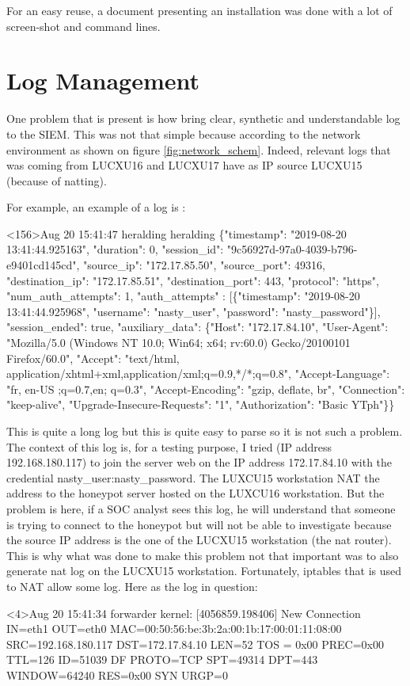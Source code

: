 \documentclass{tnreport}
\begin{document}
For an easy reuse, a document presenting an installation was done with a lot of screen-shot and command lines. 
\section{Log Management}
One problem that is present is how bring clear, synthetic and understandable log to the SIEM. This was not that simple because according to the network environment as shown on figure \ref{fig:network_schem}. Indeed, relevant logs that was coming from LUCXU16 and LUCXU17 have as IP source LUCXU15 (because of natting).

For example, an example of a log is : 

<156>Aug 20 15:41:47 heralding heralding \{"timestamp": "2019-08-20 13:41:44.925163", "duration": 0, "session\_id": "9c56927d-97a0-4039-b796-e9401cd145cd", "source\_ip": "172.17.85.50", "source\_port": 49316, "destination\_ip": "172.17.85.51", "destination\_port": 443, "protocol": "https", "num\_auth\_attempts": 1, "auth\_attempts" : [\{"timestamp": "2019-08-20 13:41:44.925968", "username": "nasty\_user", "password": "nasty\_password"\}], "session\_ended": true, "auxiliary\_data": \{"Host": "172.17.84.10", "User-Agent": "Mozilla/5.0 (Windows NT 10.0; Win64; x64; rv:60.0) Gecko/20100101 Firefox/60.0", "Accept": "text/html, application/xhtml+xml,application/xml;q=0.9,*/*;q=0.8", "Accept-Language": "fr, en-US ;q=0.7,en; q=0.3", "Accept-Encoding": "gzip, deflate, br", "Connection": "keep-alive", "Upgrade-Insecure-Requests": "1", "Authorization": "Basic YTph"\}\}

This is quite a long log but this is quite easy to parse so it is not such a problem. The context of this log is, for a testing purpose, I tried (IP address 192.168.180.117) to  join the server web on the IP address 172.17.84.10 with the credential nasty\_user:nasty\_password. The LUXCU15 workstation NAT the address to the honeypot server hosted on the LUXCU16 workstation. But the problem is here, if a SOC analyst sees this log, he will understand that someone is trying to connect to the honeypot but will not be able to investigate because the source IP address is the one of the LUCXU15 workstation (the nat router).\\
This is why what was done to make this problem not that important was to also generate nat log on the LUCXU15 workstation. Fortunately, iptables that is used to NAT allow some log. Here as the log in question:

<4>Aug 20 15:41:34 forwarder kernel: [4056859.198406] New Connection IN=eth1 OUT=eth0  MAC=00:50:56:be:3b:2a:00:1b:17:00:01:11:08:00 SRC=192.168.180.117 DST=172.17.84.10 LEN=52 TOS = 0x00 PREC=0x00 TTL=126 ID=51039 DF PROTO=TCP SPT=49314 DPT=443 WINDOW=64240 RES=0x00 SYN URGP=0 
\end{document}

